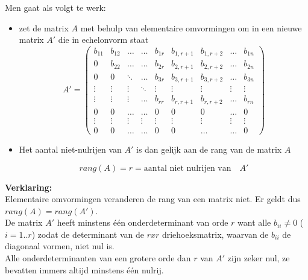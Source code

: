 \begin{itemize}
Men gaat als volgt te werk:

\begin{itemize}
	\item zet de matrix $A$ met behulp van elementaire omvormingen om in een nieuwe matrix $A'$ die in echelonvorm staat\\
	
	\[ A'= \left( \begin{matrix}
	b_{11} & b_{12} & \ldots & \ldots & b_{1r} & b_{1,r+1} & b_{1,r+2} & \ldots & b_{1n} \\
	0 & b_{22} & \ldots & \ldots & b_{2r} & b_{2,r+1} & b_{2,r+2} & \ldots & b_{2n} \\
	0 & 0 & \ddots & \ldots & b_{3r} & b_{3,r+1} & b_{3,r+2} & \ldots & b_{3n} \\
	\vdots & \vdots & \vdots & \ddots & \vdots & \vdots & \vdots & \vdots & \vdots \\
	\vdots & \vdots & \vdots & \ldots & b_{rr} & b_{r,r+1} & b_{r,r+2} & \ldots & b_{rn} \\
	0 & 0 & \ldots & \ldots & 0 & 0 & 0 & \ldots & 0\\
	\vdots & \vdots & \vdots & \vdots & \vdots & \vdots & \vdots & \vdots & \vdots \\
	0 & 0 & \ldots & \ldots & 0 & 0 & \ldots & \ldots & 0
	\end{matrix} \right) \]
	
	\item Het aantal niet-nulrijen van $A'$ is dan gelijk aan de rang van de matrix $A$
	
		\[ rang(A)=r=\textrm{aantal niet nulrijen van} \quad A'  \]
\end{itemize}

\end{itemize}

{\bf Verklaring:}\\

Elementaire omvormingen veranderen de rang van een matrix niet. Er geldt dus $rang(A)=rang(A')$.\\
De matrix $A'$ heeft minstens \'{e}\'{e}n onderdeterminant van orde $r$ want alle $b_{ii} \neq 0$ ($i=1..r$) zodat de determinant van de $rxr$ driehoeksmatrix, waarvan de $b_{ii}$ de diagonaal vormen, niet nul is.\\
Alle onderdeterminanten van een grotere orde dan $r$ van $A'$ zijn zeker nul, ze bevatten immers altijd minstens \'{e}\'{e}n nulrij.\\  


